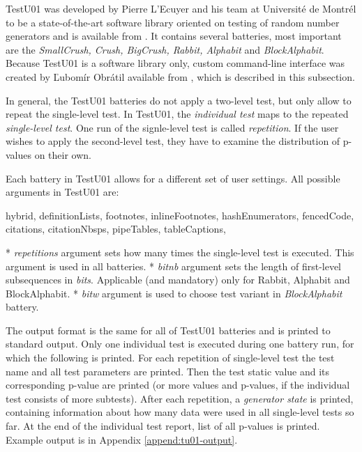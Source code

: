 \documentclass[
  digital,     %
  oneside,     %
  nosansbold,  %
  nocolorbold, %
  nolof,         %
  nolot,         %
]{fithesis4}
\begin{document}
TestU01 was developed by Pierre L'Ecuyer and his team at Université de Montrél to be a state-of-the-art software library oriented on testing of random number generators \cite{tu01_paper} and is available from \cite{tu01_site}. It contains several batteries, most important are the \emph{SmallCrush, Crush, BigCrush, Rabbit, Alphabit} and \emph{BlockAlphabit}. Because TestU01 is a software library only, custom command-line interface was created by Ľubomír Obrátil available from \cite{rtt-batteries}, which is described in this subsection.

In general, the TestU01 batteries do not apply a two-level test, but only allow to repeat the single-level test. In TestU01, the \emph{individual test} maps to the repeated \emph{single-level test}. One run of the signle-level test is called \emph{repetition}. If the user wishes to apply the second-level test, they have to examine the distribution of p-values on their own.

Each battery in TestU01 allows for a different set of user settings. All possible arguments in TestU01 are:
\begin{markdown*}{%
  hybrid,
  definitionLists,
  footnotes,
  inlineFootnotes,
  hashEnumerators,
  fencedCode,
  citations,
  citationNbsps,
  pipeTables,
  tableCaptions,
}

* \emph{repetitions} argument sets how many times the single-level test is executed. This argument is used in all batteries.
* \emph{bit\textunderscore nb} argument sets the length of first-level subsequences in \emph{bits}. Applicable (and mandatory) only for Rabbit, Alphabit and BlockAlphabit.
* \emph{bit\textunderscore w} argument is used to choose test variant in \emph{BlockAlphabit} battery.
\end{markdown*}

The output format is the same for all of TestU01 batteries and is printed to standard output. Only one individual test is executed during one battery run, for which the following is printed. For each repetition of single-level test the test name and all test parameters are printed. Then the test static value and its corresponding p-value are printed (or more values and p-values, if the individual test consists of more subtests). After each repetition, a \emph{generator state} is printed, containing information about how many data were used in all single-level tests so far. At the end of the individual test report, list of all p-values is printed. Example output is in Appendix \ref{append:tu01-output}.
\end{document}
